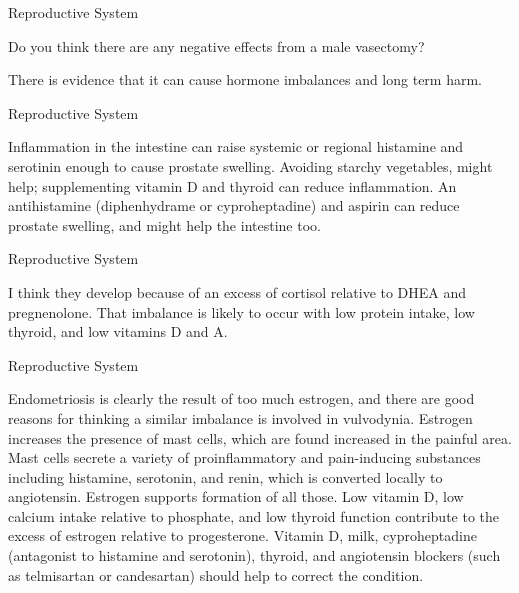 \documentclass[11pt,oneside,openany,extrafontsizes]{memoir}
\begin{document}
\begin{qaexchange}{Reproductive System}

    \begin{question}
        Do you think there are any negative effects from a male vasectomy?
    \end{question}

    \begin{answer}
      There is evidence that it can cause hormone imbalances and long term harm.
    \end{answer}
\end{qaexchange}

\begin{standalonequote}{Reproductive System}

    \begin{answer}
      Inflammation in the intestine can raise systemic or regional histamine and serotinin enough to cause prostate swelling. Avoiding starchy vegetables, might help; supplementing vitamin D and thyroid can reduce inflammation. An antihistamine (diphenhydrame or cyproheptadine) and aspirin can reduce prostate swelling, and might help the intestine too.      
    \end{answer}
\end{standalonequote}

\begin{standalonequote}{Reproductive System}

    \begin{answer}
      I think they develop because of an excess of cortisol relative to DHEA and pregnenolone. That imbalance is likely to occur with low protein intake, low thyroid, and low vitamins D and A.
    \end{answer}
\end{standalonequote}

\begin{standalonequote}{Reproductive System}

    \begin{answer}
      Endometriosis is clearly the result of too much estrogen, and there are good reasons for thinking a similar imbalance is involved in vulvodynia. Estrogen increases the presence of mast cells, which are found increased in the painful area. Mast cells secrete a variety of proinflammatory and pain-inducing substances including histamine, serotonin, and renin, which is converted locally to angiotensin. Estrogen supports formation of all those. Low vitamin D, low calcium intake relative to phosphate, and low thyroid function contribute to the excess of estrogen relative to progesterone. Vitamin D, milk, cyproheptadine (antagonist to histamine and serotonin), thyroid, and angiotensin blockers (such as telmisartan or candesartan) should help to correct the condition.
    \end{answer}
\end{standalonequote}
\end{document}
